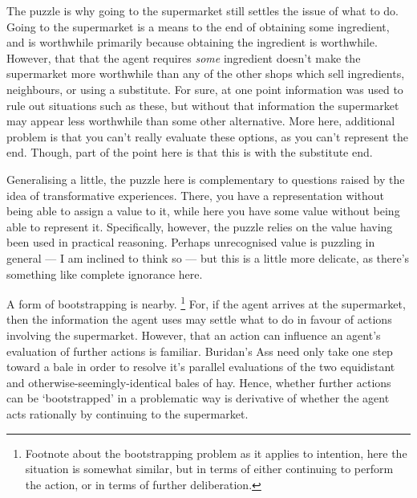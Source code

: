 \documentclass[10pt]{article}
\begin{document}
The puzzle is why going to the supermarket still settles the issue of what to do.
Going to the supermarket is a means to the end of obtaining some ingredient, and is worthwhile primarily because obtaining the ingredient is worthwhile.
However, that that the agent requires \emph{some} ingredient doesn't make the supermarket more worthwhile than any of the other shops which sell ingredients, neighbours, or using a substitute.
For sure, at one point information was used to rule out situations such as these, but without that information the supermarket may appear less worthwhile than some other alternative.
{\color{red} More here, additional problem is that you can't really evaluate these options, as you can't represent the end.
  Though, part of the point here is that this is with the substitute end.}

{\color{green} Generalising a little, the puzzle here is complementary to questions raised by the idea of transformative experiences.
  There, you have a representation without being able to assign a value to it, while here you have some value without being able to represent it.
  Specifically, however, the puzzle relies on the value having been used in practical reasoning.
Perhaps unrecognised value is puzzling in general --- I am inclined to think so --- but this is a little more delicate, as there's something like complete ignorance here.}




A form of bootstrapping is nearby.\nolinebreak
\footnote{Footnote about the bootstrapping problem as it applies to intention, here the situation is somewhat similar, but in terms of either continuing to perform the action, or in terms of further deliberation.}
For, if the agent arrives at the supermarket, then the information the agent uses may settle what to do in favour of actions involving the supermarket.
However, that an action can influence an agent's evaluation of further actions is familiar.
Buridan's Ass need only take one step toward a bale in order to resolve it's parallel evaluations of the two equidistant and otherwise-seemingly-identical bales of hay.
Hence, whether further actions can be `bootstrapped' in a problematic way is derivative of whether the agent acts rationally by continuing to the supermarket.
\end{document}
